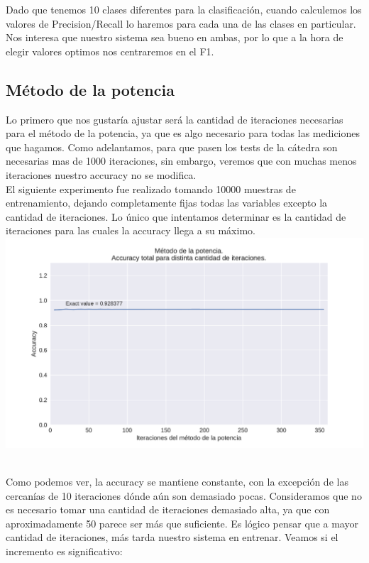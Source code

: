 Dado que tenemos 10 clases diferentes para la clasificación, cuando calculemos los valores de Precision/Recall lo haremos para cada una de las clases en particular. Nos interesa que nuestro sistema sea bueno en ambas, por lo que a la hora de elegir valores optimos nos centraremos en el F1. \\

\newpage
\subsection{Método de la potencia}

Lo primero que nos gustaría ajustar será la cantidad de iteraciones necesarias para el método de la potencia, ya que es algo necesario para todas las mediciones que hagamos. Como adelantamos, para que pasen los tests de la cátedra son necesarias mas de 1000 iteraciones, sin embargo, veremos que con muchas menos iteraciones nuestro accuracy no se modifica. \\

El siguiente experimento fue realizado tomando 10000 muestras de entrenamiento, dejando completamente fijas todas las variables excepto la cantidad de iteraciones. Lo único que intentamos determinar es la cantidad de iteraciones para las cuales la accuracy llega a su máximo. \\

{\centering
    \includegraphics[scale=0.55]{informe/imagenes/potencia/accuracyPorIters.pdf} \\
}
$ $\newline

Como podemos ver, la accuracy se mantiene constante, con la excepción de las cercanías de 10 iteraciones dónde aún son demasiado pocas. Consideramos que no es necesario tomar una cantidad de iteraciones demasiado alta, ya que con aproximadamente 50 parece ser más que suficiente. Es lógico pensar que a mayor cantidad de iteraciones, más tarda nuestro sistema en entrenar. Veamos si el incremento es significativo: \\

